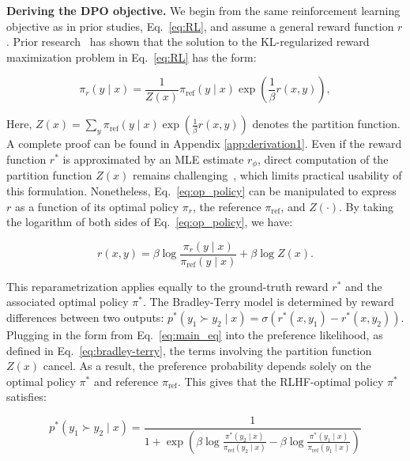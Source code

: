 \textbf{Deriving the DPO objective.} We begin from the same reinforcement learning objective as in prior studies, Eq.~\ref{eq:RL}, and assume a general reward function $r$. Prior research~\citep{peters2007reinforcement, peng2019advantage, korbak2022reinforcement, go2023aligning} has shown that the solution to the KL-regularized reward maximization problem in Eq.~\ref{eq:RL} has the form:

\begin{equation}\label{eq:op_policy}
    \pi_r(y\mid x) = \frac{1}{Z(x)}\pi_\text{ref}(y\mid x)\exp\left(\frac{1}{\beta}r(x, y)\right),
\end{equation}

Here, $Z(x) =\sum_{y}\pi_\text{ref}(y\mid x)\exp\left(\frac{1}{\beta}r(x, y)\right)$ denotes the partition function. A complete proof can be found in Appendix \ref{app:derivation1}. Even if the reward function $r^*$ is approximated by an MLE estimate $r_{\phi}$, direct computation of the partition function $Z(x)$ remains challenging~\citep{korbak2022reinforcement, go2023aligning}, which limits practical usability of this formulation. Nonetheless, Eq.~\ref{eq:op_policy} can be manipulated to express $r$ as a function of its optimal policy $\pi_r$, the reference $\pi_\text{ref}$, and $Z(\cdot)$. By taking the logarithm of both sides of Eq.~\ref{eq:op_policy}, we have:

\begin{equation}\label{eq:main_eq}
    r(x,y) =\beta \log \frac{\pi_r(y\mid x)}{\pi_\text{ref}(y\mid x)} + \beta \log Z(x).
\end{equation}

This reparametrization applies equally to the ground-truth reward $r^*$ and the associated optimal policy $\pi^*$. The Bradley-Terry model is determined by reward differences between two outputs: ${p^*(y_1 \succ y_2 \mid x) = \sigma(r^*(x, y_1) - r^*(x, y_2))}$. Plugging in the form from Eq.~\ref{eq:main_eq} into the preference likelihood, as defined in Eq.~\ref{eq:bradley-terry}, the terms involving the partition function $Z(x)$ cancel. As a result, the preference probability depends solely on the optimal policy $\pi^*$ and reference $\pi_\text{ref}$. This gives that the RLHF-optimal policy $\pi^*$ satisfies:

\begin{equation}\label{eq:objective}
    p^*(y_1\succ y_2 \mid x)=\frac{1}{1 + \exp\left(\beta \log \frac{\pi^*(y_2\mid x)}{\pi_\text{ref}(y_2\mid x)} - \beta \log \frac{\pi^*(y_1\mid x)}{\pi_\text{ref}(y_1\mid x)}\right)}
\end{equation}

